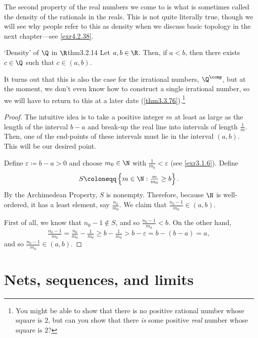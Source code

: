 The second property of the real numbers we come to is what is sometimes called the density of the rationals in the reals.  This is not quite literally true, though we will see why people refer to this as density when we discuss basic topology in the next chapter---see \cref{exr4.2.38}.
\begin{thm}{`Density' of $\Q$ in $\R$}{thm3.2.14}
Let $a,b\in \R$.  Then, if $a<b$, then there exists $c\in \Q$ such that $c\in (a,b)$.
\begin{rmk}
It turns out that this is also the case for the irrational numbers, $\Q ^{\comp}$, but at the moment, we don't even know how to construct a single irrational number, so we will have to return to this at a later date (\cref{thm3.3.76}).\footnote{You might be able to show that there is no positive rational number whose square is $2$, but can you show that there \emph{is} some positive \emph{real} number whose square is $2$?}
\end{rmk}
\begin{proof}
The intuitive idea is to take a positive integer $m$ at least as large as the length of the interval $b-a$ and break-up the real line into intervals of length $\frac{1}{m}$.  Then, one of the end-points of these intervals must lie in the interval $(a,b)$.  This will be our desired point.

Define $\varepsilon \coloneqq b-a>0$ and choose $m_0\in \N$ with $\frac{1}{m_0}<\varepsilon$ (see \cref{exr3.1.6}).  Define
\begin{equation}
S\coloneqq \left\{ m\in \N :\tfrac{m}{m_0}\geq b\right\} .
\end{equation}
By the Archimedean Property, $S$ is nonempty.  Therefore, because $\N$ is well-ordered, it has a least element, say $\frac{n_0}{m_0}$.  We claim that $\frac{n_0-1}{m_0}\in (a,b)$.

First of all, we know that $n_0-1\notin S$, and so $\frac{n_0-1}{m_0}<b$.  On the other hand,
\begin{equation}
\tfrac{n_0-1}{m_0}=\tfrac{n_0}{m_0}-\tfrac{1}{m_0}\geq b-\tfrac{1}{m_0}>b-\varepsilon =b-(b-a)=a,
\end{equation}
and so $\frac{n_0-1}{m_0}\in (a,b)$.
\end{proof}
\end{thm}

\section{Nets, sequences, and limits}

